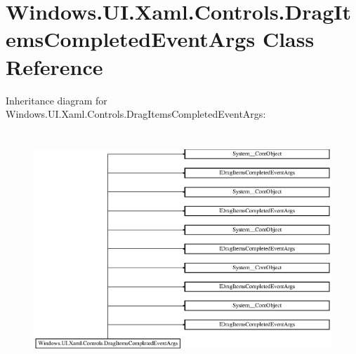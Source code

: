 \hypertarget{class_windows_1_1_u_i_1_1_xaml_1_1_controls_1_1_drag_items_completed_event_args}{}\section{Windows.\+U\+I.\+Xaml.\+Controls.\+Drag\+Items\+Completed\+Event\+Args Class Reference}
\label{class_windows_1_1_u_i_1_1_xaml_1_1_controls_1_1_drag_items_completed_event_args}
Inheritance diagram for Windows.\+U\+I.\+Xaml.\+Controls.\+Drag\+Items\+Completed\+Event\+Args\+:\begin{figure}[H]
\begin{center}
\leavevmode
\includegraphics[height=8.901734cm]{class_windows_1_1_u_i_1_1_xaml_1_1_controls_1_1_drag_items_completed_event_args}
\end{center}
\end{figure}
